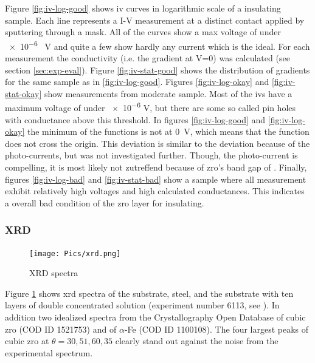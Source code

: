 Figure \ref{fig:iv-log-good} shows \gls{iv} curves in logarithmic scale of a insulating sample. 
Each line represents a I-V measurement at a distinct contact applied by sputtering through a mask. 
All of the curves show a max voltage of under \num{e-6} \SI{}{\volt} 
and quite a few show hardly any current which is the ideal. 
For each measurement the conductivity (i.e. the gradient at V=0) was calculated (see section \ref{sec:exp-eval}). 
Figure \ref{fig:iv-stat-good} shows the distribution of gradients for the same sample as in \ref{fig:iv-log-good}.
%
Figures \ref{fig:iv-log-okay} and \ref{fig:iv-stat-okay} show measurements from moderate sample. 
Most of the \gls{iv}s have a maximum voltage of under \num{e-6} V, 
but there are some so called pin holes with conductance above this threshold. %
%
In figures \ref{fig:iv-log-good} and \ref{fig:iv-log-okay} the minimum of the functions 
is not at \SI{0}{\volt}, which means that the function does not cross the origin. 
This deviation is similar to the deviation because of the photo-currents\cite{perez2018solar}, 
but was not investigated further. 
Though, the photo-current is compelling, it is most likely not zutreffend because of \gls{zro}'s band gap of \cite{sinhamahapatra2016oxygen}.
%
Finally, figures \ref{fig:iv-log-bad} and \ref{fig:iv-stat-bad} show a sample 
where all measurement exhibit relatively high voltages and high calculated conductances. 
This indicates a overall bad condition of the \gls{zro} layer for insulating. 

\subsubsection{XRD}
\begin{figure}
	\centering
	\texttt{[image: Pics/xrd.png]}
	\caption{XRD spectra}
	\label{fig:xrd}
\end{figure}

Figure \ref{fig:xrd} shows \gls{xrd} spectra of the substrate, steel, and 
the substrate with ten layers of double concentrated solution (experiment number 6113, see ).
In addition two idealized spectra from the Crystallography Open Database of cubic \gls{zro} (COD ID 1521753\cite{gkatz1971xray}) and of $\alpha$-Fe (COD ID 1100108).
The four largest peaks of cubic \gls{zro} at $\theta=30, 51, 60, 35$ clearly stand out against the noise from the experimental spectrum. %

